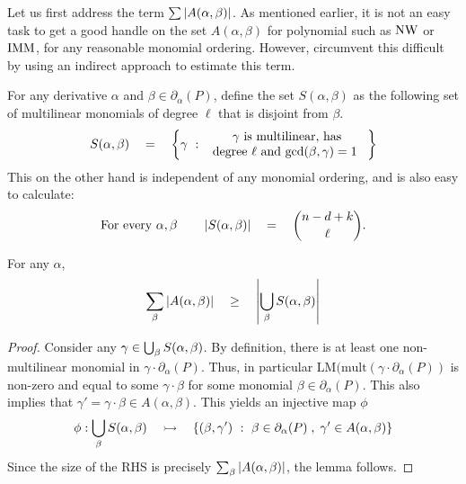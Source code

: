  Let us first address the term $\sum \left|A(\alpha, \beta)\right|$. As mentioned earlier, it is not an easy task to get a good handle on the set $A(\alpha, \beta)$ for polynomial such as $\mathrm{NW}$ or $\mathrm{IMM}$, for any reasonable monomial ordering. However, \cite{KS14} circumvent this difficult by using an indirect approach to estimate this term. 

For any derivative $\alpha$ and $\beta \in \partial_\alpha(P)$, define the set $S(\alpha, \beta)$ as the following set of multilinear monomials of degree $\ell$ that is disjoint from $\beta$. 
\[
S(\alpha, \beta) \quad = \quad \left\{{\gamma}\ : \ {\begin{array}{c}\text{$\gamma$ is multilinear, has}\\\text{degree $\ell$ and $\gcd(\beta,\gamma)=1$ }\end{array}}\right\}
\]
This on the other hand is independent of any monomial ordering, and is also easy to calculate:
\[
\text{For every $\alpha, \beta$}\quad\quad \left|S(\alpha, \beta)\right| \quad = \quad \binom{n - d + k}{\ell}.
\] 
\begin{lemma}[\cite{KS14}]\label{lem:As-to-Ss}
For any $\alpha$, 
\[
\sum_{\beta} \left|A(\alpha, \beta)\right| \quad \geq \quad \left|\bigcup_{\beta} S(\alpha, \beta)\right|
\]
\end{lemma}
\begin{proof}
Consider any $\gamma \in \bigcup_{\beta}S(\alpha, \beta)$. By definition, there is at least one non-multilinear monomial in $\gamma \cdot \partial_\alpha(P)$. Thus, in particular $\mathrm{LM}(\mathrm{mult}(\gamma \cdot \partial_\alpha(P))$ is non-zero and equal to some $\gamma \cdot \beta$ for some monomial $\beta \in \partial_\alpha(P)$. This also implies that $\gamma' = \gamma\cdot \beta \in A(\alpha, \beta)$. This yields an injective map $\phi$ 
\[
\phi:\bigcup_\beta S(\alpha,\beta) \quad \rightarrowtail \quad \left\{{(\beta, \gamma')}\ : \ {\beta\in \partial_\alpha(P)\;,\;\gamma' \in A(\alpha, \beta)}\right\}
\] 
Since the size of the RHS is precisely $\sum_\beta \left|A(\alpha, \beta)\right|$, the lemma follows. 
\end{proof}

